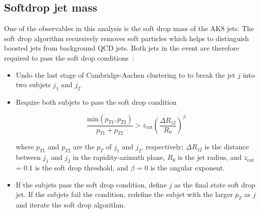 \subsection{Softdrop jet mass}

One of the observables in this analysis is the soft drop mass of the AK8 jets. The soft drop algorithm recursively removes soft particles which helps to distinguish boosted jets from background QCD jets. Both jets in the event are therefore required to pass the soft drop conditions~\cite{softdrop}:
	


\begin{itemize}

	\item Undo the last stage of Cambridge-Aachen clustering to to break the jet $j$ into two subjets $j_1$ and $j_2$.
	\item Require both subjets to pass the soft drop condition
	
	\begin{equation}
		   \frac {\text{min}(p_{T1},p_{T2} )}{p_{T1} + p_{T2}} >   z_{\text{cut}} \left( \frac{ \Delta R_{12} }{ R_0 } \right)^{\beta}
	\end{equation}
	
	where $p_{T1}$ and $p_{T2}$ are the $p_{T}$ of $j_1$ and $j_2$, respectively; $\Delta R_{12}$ is the distance between $j_1$ and $j_2$ in the rapidity-azimuth plane, $R_0$ is the jet radius, and $z_{\text{cut}}$ = 0.1 is the soft drop threshold, and $\beta$ = 0 is the angular exponent. 
	
	\item If the subjets pass the soft drop condition, define $j$ as the final state soft drop jet. If the subjets fail the condition, redefine the subjet with the larger $p_T$ as $j$ and iterate the soft drop algorithm.
	
\end{itemize}



